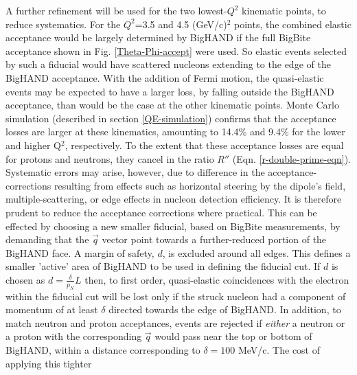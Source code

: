\documentclass[12pt,letterpaper,oneside]{article}
\begin{document}
A further refinement will be used 
for the two lowest-$Q^2$ kinematic points,
to reduce systematics.  For 
the $Q^2$=3.5 and 4.5 (GeV/c)$^2$ points, the combined 
elastic acceptance would be largely determined by
BigHAND if the full BigBite acceptance shown in Fig.
\ref{Theta-Phi-accept} were used.   
So elastic events selected by such a fiducial would have
scattered nucleons extending to the edge of the BigHAND acceptance.
With the addition of Fermi motion, the quasi-elastic events may be
expected to have a larger loss, by falling outside the BigHAND
acceptance, than would be the case at the other kinematic points.
Monte Carlo simulation (described in section \ref{QE-simulation})
confirms that the acceptance losses are larger at these kinematics,
amounting to 14.4\% and 9.4\% for the lower and higher Q$^2$,
respectively.  To the extent that these acceptance
losses are equal for protons and neutrons, they cancel in the ratio
$R''$ (Eqn. \ref{r-double-prime-eqn}).  Systematic errors may arise,
however, due to difference in the acceptance-corrections resulting from
effects such as horizontal steering by the dipole's field, 
multiple-scattering, or edge effects in nucleon detection efficiency.
It is therefore prudent to reduce the acceptance corrections where
practical.  This can be effected by choosing a new smaller fiducial, 
based on BigBite measurements, by demanding that the $\vec q$ vector
point towards a 
further-reduced portion of the BigHAND face.   A margin of
safety, $d$, is excluded around all edges.
This defines a smaller 'active' area of BigHAND to be used in defining
the fiducial cut.
If $d$ is chosen as $d=\frac{\delta}{p_N}L$
then, to first order, quasi-elastic coincidences with the electron
within the fiducial cut will be lost only if the struck nucleon had a
component of momentum of at least $\delta$ directed towards the edge
of BigHAND.  
In addition, to match neutron and proton acceptances, events are
 rejected if {\em either} a neutron or a proton with the corresponding 
$\vec{q}$ would pass near the top or bottom of BigHAND, within a
 distance corresponding to $\delta=100$ MeV/c.
 The cost of applying this tighter
\end{document}
